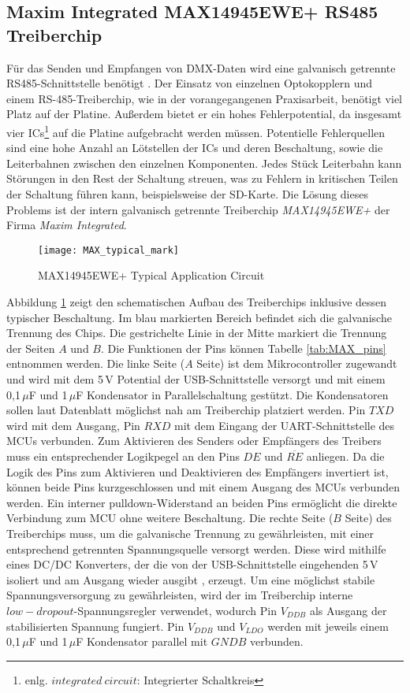 \newpage
\subsection{Maxim Integrated MAX14945EWE+ RS485 Treiberchip}

Für das Senden und Empfangen von DMX-Daten wird eine galvanisch getrennte RS485-Schnittstelle benötigt \cite[S.6-8]{Bauer2021}. Der Einsatz von einzelnen Optokopplern und einem RS-485-Treiberchip, wie in der vorangegangenen Praxisarbeit, benötigt viel Platz auf der Platine. Außerdem bietet er ein hohes Fehlerpotential, da insgesamt vier ICs\footnote{enlg. $integrated\ circuit$: Integrierter Schaltkreis} auf die Platine aufgebracht werden müssen. Potentielle Fehlerquellen sind eine hohe Anzahl an Lötstellen der ICs und deren Beschaltung, sowie die Leiterbahnen zwischen den einzelnen Komponenten. Jedes Stück Leiterbahn kann Störungen in den Rest der Schaltung streuen, was zu Fehlern in kritischen Teilen der Schaltung führen kann, beispielsweise der SD-Karte. Die Lösung dieses Problems ist der intern galvanisch getrennte Treiberchip \textit{MAX14945EWE+} der Firma \textit{Maxim Integrated}.
\begin{figure}[h]
	\begin{center}
		\texttt{[image: MAX\_typical\_mark]}
		\caption{MAX14945EWE+ Typical Application Circuit \cite[s.19]{MAX14945MN}}
		\label{fig:MAXfd}
	\end{center}
\end{figure}
Abbildung \ref{fig:MAXfd} zeigt den schematischen Aufbau des Treiberchips inklusive dessen typischer Beschaltung. Im blau markierten Bereich befindet sich die galvanische Trennung des Chips. Die gestrichelte Linie in der Mitte markiert die Trennung der Seiten $A$ und $B$. Die Funktionen der Pins können Tabelle \ref{tab:MAX_pins} entnommen werden. Die linke Seite ($A$ Seite) ist dem Mikrocontroller zugewandt und wird mit dem 5\,V Potential der USB-Schnittstelle versorgt und mit einem 0,1\,$\mu$F und 1\,$\mu$F Kondensator in Parallelschaltung gestützt. Die Kondensatoren sollen laut Datenblatt möglichst nah am Treiberchip platziert werden. Pin $TXD$ wird mit dem Ausgang, Pin $RXD$ mit dem Eingang der UART-Schnittstelle des MCUs verbunden. Zum Aktivieren des Senders oder Empfängers des Treibers muss ein entsprechender Logikpegel an den Pins $DE$ und $\overline{RE}$ anliegen. Da die Logik des Pins zum Aktivieren und Deaktivieren des Empfängers invertiert ist, können beide Pins kurzgeschlossen und mit einem Ausgang des MCUs verbunden werden. Ein interner pulldown-Widerstand an beiden Pins ermöglicht die direkte Verbindung zum MCU ohne weitere Beschaltung. Die rechte Seite ($B$ Seite) des Treiberchips muss, um die galvanische Trennung zu gewährleisten, mit einer entsprechend getrennten Spannungsquelle versorgt werden. Diese wird mithilfe eines DC/DC Konverters, der die von der USB-Schnittstelle eingehenden 5\,V isoliert und am Ausgang wieder ausgibt \cite{DC_MN}, erzeugt. Um eine möglichst stabile Spannungsversorgung zu gewährleisten, wird der im Treiberchip interne $low-dropout$-Spannungsregler verwendet, wodurch Pin $V_{DDB}$ als Ausgang der stabilisierten Spannung fungiert. Pin $V_{DDB}$ und $V_{LDO}$ werden mit jeweils einem 0,1\,$\mu$F und 1\,$\mu$F Kondensator parallel mit $GNDB$ verbunden.
